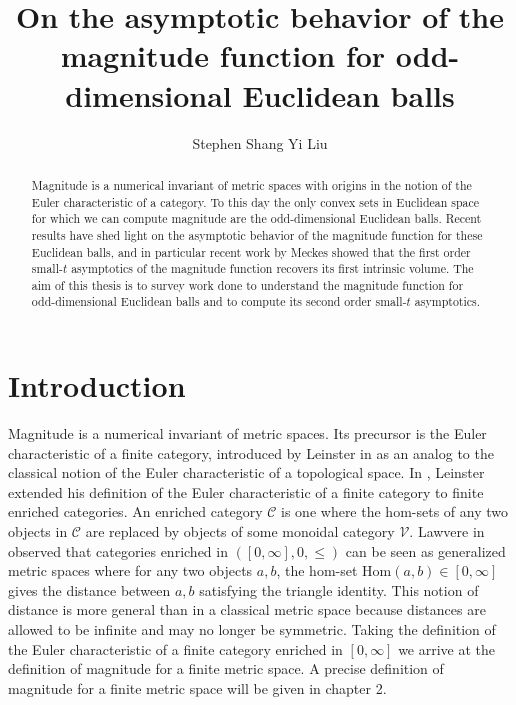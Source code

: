 \documentclass[11pt]{article}
\theoremstyle{mythm}
\begin{document}
\author{Stephen Shang Yi Liu}
\title{On the asymptotic behavior of the magnitude function for odd-dimensional Euclidean balls}
\date{}

\maketitle

\begin{abstract}
Magnitude is a numerical invariant of metric spaces with origins in the notion of the Euler characteristic of a category. To this day the only convex sets in Euclidean space for which we can compute magnitude are the odd-dimensional Euclidean balls. Recent results have shed light on the asymptotic behavior of the magnitude function for these Euclidean balls, and in particular recent work by Meckes showed that the first order small-$t$ asymptotics of the magnitude function recovers its first intrinsic volume. The aim of this thesis is to survey work done to understand the magnitude function for odd-dimensional Euclidean balls and to compute its second order small-$t$ asymptotics.
\end{abstract}

\newpage

\tableofcontents

\newpage

\section{Introduction}

Magnitude is a numerical invariant of metric spaces. Its precursor is the Euler characteristic of a finite category, introduced by Leinster in \cite{leinster_euler_2006} as an analog to the classical notion of the Euler characteristic of a topological space. In \cite{leinster_magnitude_2011}, Leinster extended his definition of the Euler characteristic of a finite category to finite enriched categories. An enriched category $\mathscr{C}$ is one where the hom-sets of any two objects in $\mathscr{C}$ are replaced by objects of some monoidal category $\mathscr{V}$. Lawvere in \cite{lawvere_metric_1973} observed that categories enriched in $([0,\infty],0,\leq)$ can be seen as generalized metric spaces where for any two objects $a,b$, the hom-set $\text{Hom}(a,b) \in [0,\infty]$ gives the distance between $a,b$ satisfying the triangle identity. This notion of distance is more general than in a classical metric space because distances are allowed to be infinite and may no longer be symmetric. Taking the definition of the Euler characteristic of a finite category enriched in $[0,\infty]$ we arrive at the definition of magnitude for a finite metric space. A precise definition of magnitude for a finite metric space will be given in chapter 2.
\end{document}
